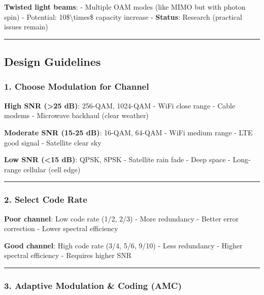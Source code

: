 \textbf{Twisted light beams}: - Multiple OAM modes (like MIMO but with
photon spin) - Potential: 10\$\textbackslash times\$ capacity increase -
\textbf{Status}: Research (practical issues remain)

\begin{center}\rule{0.5\linewidth}{0.5pt}\end{center}

\subsection{Design Guidelines}\label{design-guidelines}

\subsubsection{1. Choose Modulation for
Channel}\label{choose-modulation-for-channel}

\textbf{High SNR (\textgreater25 dB)}: 256-QAM, 1024-QAM - WiFi close
range - Cable modems - Microwave backhaul (clear weather)

\textbf{Moderate SNR (15-25 dB)}: 16-QAM, 64-QAM - WiFi medium range -
LTE good signal - Satellite clear sky

\textbf{Low SNR (\textless15 dB)}: QPSK, 8PSK - Satellite rain fade -
Deep space - Long-range cellular (cell edge)

\begin{center}\rule{0.5\linewidth}{0.5pt}\end{center}

\subsubsection{2. Select Code Rate}\label{select-code-rate}

\textbf{Poor channel}: Low code rate (1/2, 2/3) - More redundancy -
Better error correction - Lower spectral efficiency

\textbf{Good channel}: High code rate (3/4, 5/6, 9/10) - Less redundancy
- Higher spectral efficiency - Requires higher SNR

\begin{center}\rule{0.5\linewidth}{0.5pt}\end{center}

\subsubsection{3. Adaptive Modulation \& Coding
(AMC)}\label{adaptive-modulation-coding-amc}

